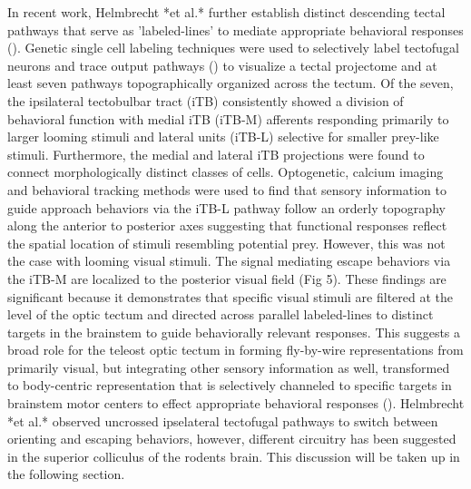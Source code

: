 \documentclass{ar-1col}
\begin{document}
In recent work, Helmbrecht *et al.* further establish distinct descending tectal pathways that serve as 'labeled-lines' to mediate appropriate behavioral responses (\cite{helmbrecht2018topography}). Genetic single cell labeling techniques were used to selectively label tectofugal neurons and trace output pathways (\cite{scott2007targeting}) to visualize a tectal projectome and at least seven pathways topographically organized across the tectum. Of the seven, the ipsilateral tectobulbar tract (iTB) consistently showed a division of behavioral function with medial iTB (iTB-M) afferents responding primarily to larger looming stimuli and lateral units (iTB-L) selective for smaller prey-like stimuli. Furthermore, the medial and lateral iTB projections were found to connect morphologically distinct classes of cells. Optogenetic, calcium imaging and behavioral tracking methods were used to find that sensory information to guide approach behaviors via the iTB-L pathway follow an orderly topography along the anterior to posterior axes suggesting that functional responses reflect the spatial location of stimuli resembling potential prey. However, this was not the case with looming visual stimuli. The signal mediating escape behaviors via the iTB-M are localized to the posterior visual field (Fig 5). These findings are significant because it demonstrates that specific visual stimuli are filtered at the level of the optic tectum and directed across parallel labeled-lines to distinct targets in the brainstem to guide behaviorally relevant responses. This suggests a broad role for the teleost optic tectum in forming fly-by-wire representations from primarily visual, but integrating other sensory information as well, transformed to body-centric representation that is selectively channeled to specific targets in brainstem motor centers to effect appropriate behavioral responses (\cite{northmore2011optic}). Helmbrecht *et al.* observed uncrossed ipselateral tectofugal pathways to switch between orienting and escaping behaviors, however, different circuitry has been suggested in the superior colliculus of the rodents brain. This discussion will be taken up in the following section.

\end{document}
